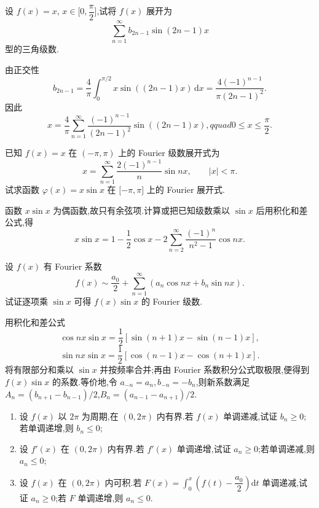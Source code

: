 \begin{example}
    设 $f(x)=x$, $x\in\lbrack 0,\dfrac{\pi}{2}\rbrack$,试将 $f(x)$ 展开为
    \[
        \displaystyle\sum\limits_{n=1}^{\infty}b_{2n-1}\sin(2n-1)x
    \]
    型的三角级数.
\end{example}
\exampleblank

\begin{solution}
    由正交性
    \[
        b_{2n-1}=\dfrac{4}{\pi}\int_0^{\pi/2}x\sin((2n-1)x)\,\mathrm{d}x
        =\dfrac{4(-1)^{n-1}}{\pi(2n-1)^2}.
    \]
    因此
    \[
        x=\dfrac{4}{\pi}\sum\limits_{n=1}^{\infty}
        \dfrac{(-1)^{n-1}}{(2n-1)^2}\sin((2n-1)x),qquad0\leq x\leq\dfrac{\pi}{2}.
    \]
\end{solution}

\begin{example}
    已知 $f(x)=x$ 在 $(-\pi,\pi)$ 上的 Fourier 级数展开式为
    \[
        x=\sum\limits_{n=1}^{\infty}\dfrac{2(-1)^{n-1}}{n}\sin nx,
        \qquad |x|<\pi.
    \]
    试求函数 $\varphi(x)=x\sin x$ 在 $\lbrack -\pi,\pi\rbrack$ 上的 Fourier 展开式.
\end{example}
\exampleblank

\begin{solution}
    函数 $x\sin x$ 为偶函数,故只有余弦项.计算或把已知级数乘以 $\sin x$ 后用积化和差公式,得
    \[
        x\sin x=1-\dfrac{1}{2}\cos x-
        2\sum\limits_{n=2}^{\infty}\dfrac{(-1)^n}{n^2-1}\cos nx.
    \]
\end{solution}

\begin{example}
    设 $f(x)$ 有 Fourier 系数
    \[
        f(x)\sim\dfrac{a_0}{2}+\sum\limits_{n=1}^{\infty}(a_n\cos nx+b_n\sin nx).
    \]
    试证逐项乘 $\sin x$ 可得 $f(x)\sin x$ 的 Fourier 级数.
\end{example}
\exampleblank

\begin{solution}
    用积化和差公式
    \[
        \cos nx\sin x=\dfrac{1}{2}[\sin(n+1)x-\sin(n-1)x],
    \]
    \[
        \sin nx\sin x=\dfrac{1}{2}[\cos(n-1)x-\cos(n+1)x].
    \]
    将有限部分和乘以 $\sin x$ 并按频率合并;再由 Fourier 系数积分公式取极限,便得到 $f(x)\sin x$ 的系数.等价地,令 $a_{-n}=a_n,b_{-n}=-b_n$,则新系数满足
    $A_n=(b_{n+1}-b_{n-1})/2$,$B_n=(a_{n-1}-a_{n+1})/2$.
\end{solution}

\begin{example}[\markstar]
    \begin{enumerate}
        \item 设 $f(x)$ 以 $2\pi$ 为周期,在 $(0,2\pi)$ 内有界.若 $f(x)$ 单调递减,试证 $b_n\geq0$;若单调递增,则 $b_n\leq0$;
        \item 设 $f'(x)$ 在 $(0,2\pi)$ 内有界.若 $f'(x)$ 单调递增,试证 $a_n\geq0$;若单调递减,则 $a_n\leq0$;
        \item 设 $f(x)$ 在 $(0,2\pi)$ 内可积.若 $F(x)=\displaystyle\int_0^x\left(f(t)-\dfrac{a_0}{2}\right)\mathrm{d}t$ 单调递减,试证 $a_n\geq0$;若 $F$ 单调递增,则 $a_n\leq0$.
    \end{enumerate}
\end{example}
\exampleblank

